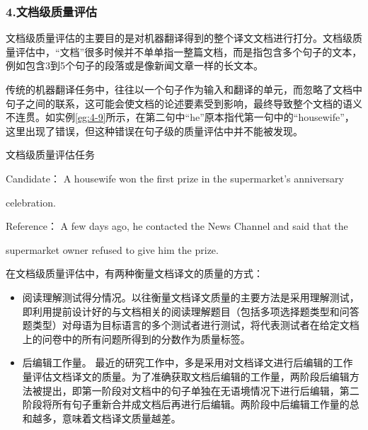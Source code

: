 
\subsubsection{4.文档级质量评估}

\parinterval 文档级质量评估的主要目的是对机器翻译得到的整个译文文档进行打分。文档级质量评估中，“文档”很多时候并不单单指一整篇文档，而是指包含多个句子的文本，例如包含3到5个句子的段落或是像新闻文章一样的长文本。

\parinterval 传统的机器翻译任务中，往往以一个句子作为输入和翻译的单元，而忽略了文档中句子之间的联系，这可能会使文档的论述要素受到影响，最终导致整个文档的语义不连贯。如实例\ref{eg:4-9}所示，在第二句中“he”原本指代第一句中的“housewife”，这里出现了错误，但这种错误在句子级的质量评估中并不能被发现。

\begin{example}
文档级质量评估任务

Candidate： A {\red housewife} won the first prize in the supermarket's anniversary

\hspace{5em}celebration.

Reference： A few days ago, {\red he} contacted the News Channel and said that the

\hspace{5em}supermarket owner refused to give {\red him} the prize.
\label{eg:4-9}
\end{example}

\parinterval 在文档级质量评估中，有两种衡量文档译文的质量的方式：

\begin{itemize}
\vspace{0.5em}
\item 阅读理解测试得分情况。以往衡量文档译文质量的主要方法是采用理解测试，即利用提前设计好的与文档相关的阅读理解题目（包括多项选择题类型和问答题类型）对母语为目标语言的多个测试者进行测试，将代表测试者在给定文档上的问卷中的所有问题所得到的分数作为质量标签。
\vspace{0.5em}
\item 后编辑工作量。 最近的研究工作中，多是采用对文档译文进行后编辑的工作量评估文档译文的质量。为了准确获取文档后编辑的工作量，两阶段后编辑方法被提出，即第一阶段对文档中的句子单独在无语境情况下进行后编辑，第二阶段将所有句子重新合并成文档后再进行后编辑。两阶段中后编辑工作量的总和越多，意味着文档译文质量越差。
\vspace{0.5em}
\end{itemize}

